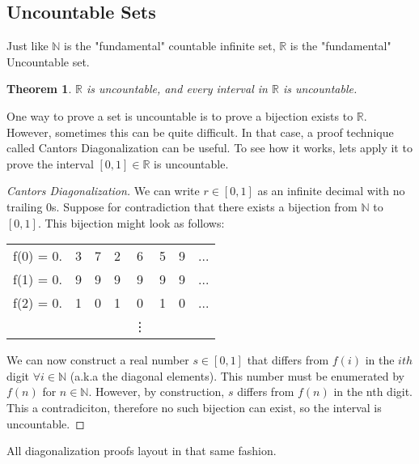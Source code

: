 \documentclass{article}
\newtheorem{theorem}{Theorem}
\newtheorem{proof}{Proof}
\begin{document}
\subsection{Uncountable Sets}
Just like $\mathbb{N}$ is the "fundamental" countable infinite set, $\mathbb{R}$ is the "fundamental" Uncountable set.
\begin{theorem}
    $\mathbb{R}$ is uncountable, and every interval in $\mathbb{R}$ is uncountable.
\end{theorem}
One way to prove a set is uncountable is to prove a bijection exists to $\mathbb{R}$. However, sometimes this can be quite difficult.
In that case, a proof technique called Cantors Diagonalization can be useful. To see how it works, lets apply it to prove the interval $[0, 1]\in\mathbb{R}$
is uncountable.
\begin{proof}[Cantors Diagonalization]
    We can write $r\in[0, 1]$ as an infinite decimal with no trailing 0s.
    Suppose for contradiction that there exists a bijection from $\mathbb{N}$ to $[0, 1]$.
    This bijection might look as follows:
    \centering
    \begin{tabular}{cccccccc}
        f(0) = 0. & 3 & 7 & 2 & 6 & 5 & 9 & ...\\
        f(1) = 0. & 9 & 9 & 9 & 9 & 9 & 9 & ...\\
        f(2) = 0. & 1 & 0 & 1 & 0 & 1 & 0 & ...\\
        & & & & \vdots
    \end{tabular}
    We can now construct a real number $s\in[0, 1]$ that differs from $f(i)$ in the $ith$ digit $\forall i\in\mathbb{N}$
(a.k.a the diagonal elements). This number must be enumerated by $f(n)$ for $n\in\mathbb{N}$. However, by construction,
$s$ differs from $f(n)$ in the nth digit. This a contradiciton, therefore no such bijection can exist, so the interval is uncountable.
\end{proof}
All diagonalization proofs layout in that same fashion.
\end{document}
